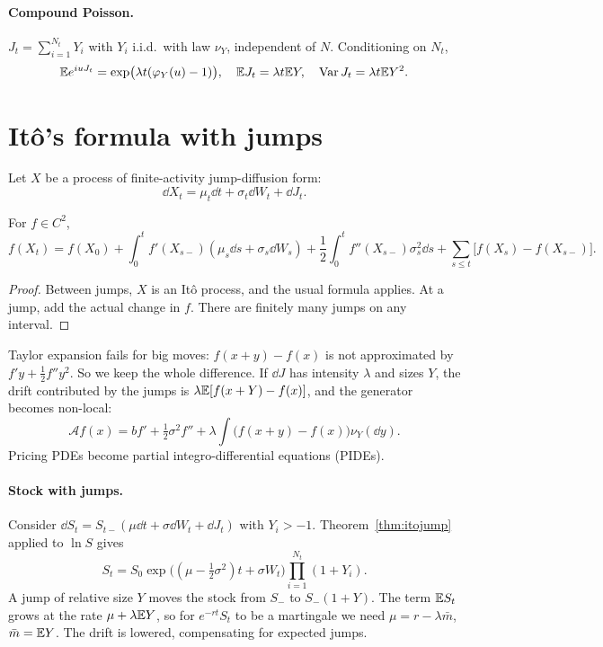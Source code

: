 \paragraph{Compound Poisson.} $J_t=\sum_{i=1}^{N_t}Y_i$ with $Y_i$ i.i.d.\ with law $\nu_Y$, independent of $N$. Conditioning on $N_t$,
\[
\mathbb{E} e^{iuJ_t}=\exp\bigl(\lambda t(\varphi_Y(u)-1)\bigr),\quad\mathbb{E} J_t=\lambda t\mathbb{E} Y,\quad\operatorname{Var} J_t=\lambda t\mathbb{E} Y^2.
\]

\section{It\^o's formula with jumps}

Let $X$ be a process of finite-activity jump-diffusion form:
\[
\dd X_t=\mu_t\dd t+\sigma_t\dd W_t+\dd J_t.
\]

\begin{theorem}\label{thm:itojump}
For $f\in C^2$,
\[
f(X_t)=f(X_0)+\int_0^tf'(X_{s-})(\mu_s\dd s+\sigma_s\dd W_s)+\frac12\int_0^tf''(X_{s-})\sigma_s^2\dd s+\sum_{s\le t}\bigl[f(X_s)-f(X_{s-})\bigr].
\]
\end{theorem}
\begin{proof}
Between jumps, $X$ is an Itô process, and the usual formula applies. At a jump, add the actual change in $f$. There are finitely many jumps on any interval.
\end{proof}

\begin{intuition}
Taylor expansion fails for big moves: $f(x+y)-f(x)$ is not approximated by $f'y+\tfrac12f''y^2$. So we keep the whole difference. If $\dd J$ has intensity $\lambda$ and sizes $Y$, the drift contributed by the jumps is $\lambda\mathbb{E}[f(x+Y)-f(x)]$, and the generator becomes non-local:
\[
\mathcal{A}f(x)=bf'+\tfrac12\sigma^2f''+\lambda\int\bigl(f(x+y)-f(x)\bigr)\nu_Y(\dd y).
\]
Pricing PDEs become partial integro-differential equations (PIDEs).
\end{intuition}

\paragraph{Stock with jumps.} Consider $\dd S_t=S_{t-}(\mu\dd t+\sigma\dd W_t+\dd J_t)$ with $Y_i>-1$. Theorem~\ref{thm:itojump} applied to $\ln S$ gives
\begin{equation}\label{eq:jumpsol}
S_t=S_0\exp\bigl((\mu-\tfrac12\sigma^2)t+\sigma W_t\bigr)\prod_{i=1}^{N_t}(1+Y_i).
\end{equation}
A jump of relative size $Y$ moves the stock from $S_{-}$ to $S_-(1+Y)$. The term $\mathbb{E} S_t$ grows at the rate $\mu+\lambda\mathbb{E} Y$, so for $e^{-rt}S_t$ to be a martingale we need $\mu=r-\lambda\bar m$, $\bar m=\mathbb{E} Y$. The drift is lowered, compensating for expected jumps.


